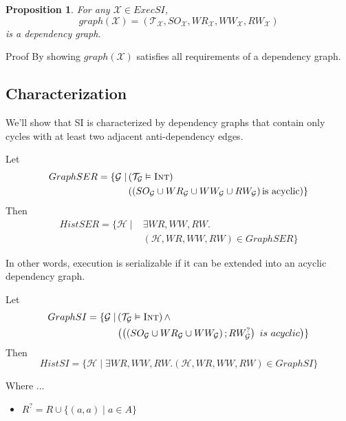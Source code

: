 \documentclass{beamer}
\newtheorem*{prop}{Proposition}
\begin{document}
\begin{frame}
	\begin{prop}
		For any $\mathcal{X} \in ExecSI$,
		$$
			graph(\mathcal{X}) = (\mathcal{T}_\mathcal{X}, SO_\mathcal{X}, WR_\mathcal{X}, WW_\mathcal{X}, RW_\mathcal{X})
		$$
		is a dependency graph.
	\end{prop}
	\begin{block}{Proof}
		By showing $graph(\mathcal{X})$ satisfies all requirements of a dependency graph.
	\end{block}
\end{frame}

\subsection{Characterization}

\begin{frame}
	We'll show that SI is characterized by dependency graphs that contain only cycles with at least two adjacent anti-dependency edges.
\end{frame}

\begin{frame}
	\begin{theorem}
		Let
		$$
		\begin{aligned}
			GraphSER = \{ \mathcal{G} \mid & \left( \mathcal{T}_\mathcal{G} \vDash \textsc{Int} \right) \\
			      & \left(
		      		\left(
		    	  	 SO_\mathcal{G} \cup WR_\mathcal{G} \cup WW_\mathcal{G} \cup RW_\mathcal{G}
			      	\right) \text{is acyclic}
			        \right) \}
		\end{aligned}
		$$
		Then 
		$$
		\begin{aligned}
			HistSER = \{ \mathcal{H} \mid & \exists WR, WW, RW. \\
			& \left( \mathcal{H}, WR, WW, RW \right) \in GraphSER \}
		\end{aligned}
		$$	
	\end{theorem}
	In other words, execution is serializable if it can be extended into an acyclic dependency graph.
\end{frame}


\begin{frame}
	\begin{theorem}
		Let
		$$
			\begin{aligned}
			GraphSI = 
				\{ 
					\mathcal{G} 
					\mid &
					\left( \mathcal{T}_\mathcal{G} \vDash \textsc{Int} \right) \wedge \\
						 & \left(
							\left(
								\left(
									SO_\mathcal{G} \cup WR_\mathcal{G} \cup WW_\mathcal{G}
								\right)  ; RW_\mathcal{G}^?
						\right) \ is \ acyclic
					\right)
				\}	
			\end{aligned}
		$$
		Then
		$$
			HistSI = \{ \mathcal{H} \mid \exists WR, WW, RW. (\mathcal{H}, WR, WW, RW) \in GraphSI \}
		$$
	\end{theorem}
	Where ...
	\begin{itemize}
		\item $R^? = R \cup \{ (a, a) \mid a \in A \}$
	\end{itemize}
\end{frame}
\end{document}
